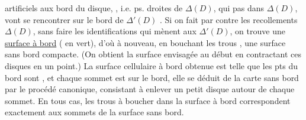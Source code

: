 

artificiels aux bord du disque, , i.e.  ps. droites de $\Delta(D)$, qui  pas dans $\Delta(D)$, vont se rencontrer sur le bord de $\Delta'(D)$ \deleted{\unsure{;} }. Si on fait par contre les recollements   $\Delta(D)$, sans faire les identifications qui mènent aux $\Delta'(D)$, on trouve une \uline{surface à bord} ( en vert), d'où à nouveau, en bouchant les trous , une surface sans bord compacte. (On obtient la surface envisagée au début en contractant  ces disques en  un point.) La surface cellulaire à bord obtenue est telle que les pts du bord sont  , et chaque sommet est sur le bord, elle se déduit de la carte sans bord par le procédé canonique, consistant à enlever un petit disque autour de chaque sommet. En tous cas, les trous à boucher dans la surface à bord correspondent exactement aux sommets de la surface sans bord.

